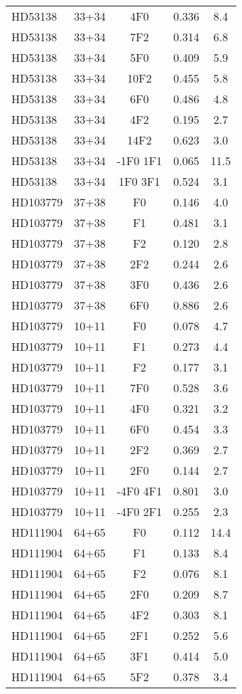 \begin{table*}
\begin{tabular}{l c c c c}
HD53138 & 33+34 & 4F0 & 0.336 & 8.4\\ 
HD53138 & 33+34 & 7F2 & 0.314 & 6.8\\ 
HD53138 & 33+34 & 5F0 & 0.409 & 5.9\\ 
HD53138 & 33+34 & 10F2 & 0.455 & 5.8\\ 
HD53138 & 33+34 & 6F0 & 0.486 & 4.8\\ 
HD53138 & 33+34 & 4F2 & 0.195 & 2.7\\ 
HD53138 & 33+34 & 14F2 & 0.623 & 3.0\\ 
HD53138 & 33+34 & -1F0 1F1 & 0.065 & 11.5\\ 
HD53138 & 33+34 & 1F0 3F1 & 0.524 & 3.1\\ 
\hline
HD103779 & 37+38 & F0 & 0.146 & 4.0\\ 
HD103779 & 37+38 & F1 & 0.481 & 3.1\\ 
HD103779 & 37+38 & F2 & 0.120 & 2.8\\ 
HD103779 & 37+38 & 2F2 & 0.244 & 2.6\\ 
HD103779 & 37+38 & 3F0 & 0.436 & 2.6\\ 
HD103779 & 37+38 & 6F0 & 0.886 & 2.6\\ 
\hline
HD103779 & 10+11 & F0 & 0.078 & 4.7\\ 
HD103779 & 10+11 & F1 & 0.273 & 4.4\\ 
HD103779 & 10+11 & F2 & 0.177 & 3.1\\ 
HD103779 & 10+11 & 7F0 & 0.528 & 3.6\\ 
HD103779 & 10+11 & 4F0 & 0.321 & 3.2\\ 
HD103779 & 10+11 & 6F0 & 0.454 & 3.3\\ 
HD103779 & 10+11 & 2F2 & 0.369 & 2.7\\ 
HD103779 & 10+11 & 2F0 & 0.144 & 2.7\\ 
HD103779 & 10+11 & -4F0 4F1 & 0.801 & 3.0\\ 
HD103779 & 10+11 & -4F0 2F1 & 0.255 & 2.3\\ 
\hline
HD111904 & 64+65 & F0 & 0.112 & 14.4\\ 
HD111904 & 64+65 & F1 & 0.133 & 8.4\\ 
HD111904 & 64+65 & F2 & 0.076 & 8.1\\ 
HD111904 & 64+65 & 2F0 & 0.209 & 8.7\\ 
HD111904 & 64+65 & 4F2 & 0.303 & 8.1\\ 
HD111904 & 64+65 & 2F1 & 0.252 & 5.6\\ 
HD111904 & 64+65 & 3F1 & 0.414 & 5.0\\ 
HD111904 & 64+65 & 5F2 & 0.378 & 3.4\\ 

\end{tabular}
\end{table*}
